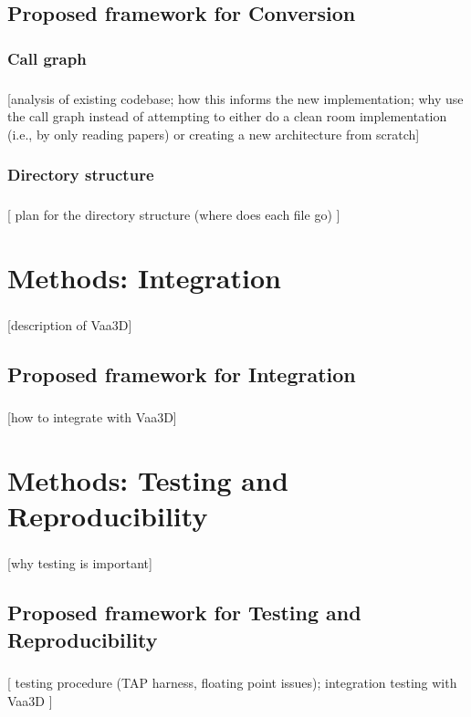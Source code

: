\documentclass{beamer}
\newcommand{\tbackground}[1]{#1}
\newcommand{\tmetrics}[1]{#1}
\newcommand{\tbackground}[1]{\textcolor{tbackground}{#1}}
\newcommand{\tmetrics}[1]{\textcolor{tmetrics}{#1}}
\begin{document}
\subsection{Proposed framework for Conversion}

\subsubsection{Call graph}
\begin{frame}\frametitle{\subsubsecname}
	[\tbackground{analysis of existing codebase; how this informs the new
	implementation; why use the call graph instead of
	attempting to either do a clean room implementation (i.e.,
	by only reading papers) or creating a new architecture
	from scratch}]
\end{frame}

\subsubsection{Directory structure}
\begin{frame}\frametitle{\subsubsecname}
	[ plan for the directory structure (where does each file
	go) ]
\end{frame}

\section{Methods: Integration}
\begin{frame}\frametitle{\secname}
	[\tbackground{description of Vaa3D}]
\end{frame}

\subsection{Proposed framework for Integration}
\begin{frame}\frametitle{\subsecname}
	[how to integrate with Vaa3D]
\end{frame}

\section{Methods: Testing and Reproducibility}
\begin{frame}\frametitle{\secname}
	[\tmetrics{why testing is important}]
\end{frame}

\subsection{Proposed framework for Testing and Reproducibility}
\begin{frame}\frametitle{\subsecname}
	[
		testing procedure (TAP harness, floating point
		issues); integration testing with Vaa3D
	]
\end{frame}
\end{document}
